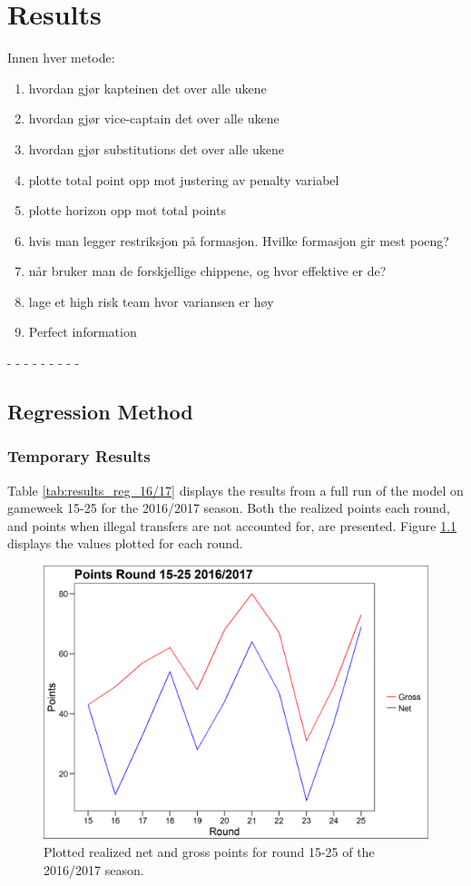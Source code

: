 
\chapter{Results}
Innen hver metode:
\begin{enumerate}
    \item hvordan gjør kapteinen det over alle ukene
    \item hvordan gjør vice-captain det over alle ukene
    \item hvordan gjør substitutions det over alle ukene
    \item plotte total point opp mot justering av penalty variabel
    \item plotte horizon opp mot total points
    \item hvis man legger restriksjon på formasjon. Hvilke formasjon gir mest poeng?
    \item når bruker man de forskjellige chippene, og hvor effektive er de?  
    \item lage et high risk team hvor variansen er høy
    \item Perfect information
\end{enumerate}
-  
- 
-  
-  
-  
- 
- 
-  
-  
\section{Regression Method}
\subsection{Temporary Results}

Table \ref{tab:results_reg_16/17} displays the results from a full run of the model on gameweek 15-25 for the 2016/2017 season. Both the realized points each round, and points when illegal transfers are not accounted for, are presented. Figure \ref{fig:points_15_25_16/17} displays the values plotted for each round.

\begin{figure}[H]
\centering
\includegraphics[scale=0.35]{fig/points_15_to_25.png}
 \caption{Plotted realized net and gross points for round 15-25 of the 2016/2017 season.}
\label{fig:points_15_25_16/17}
\end{figure}

